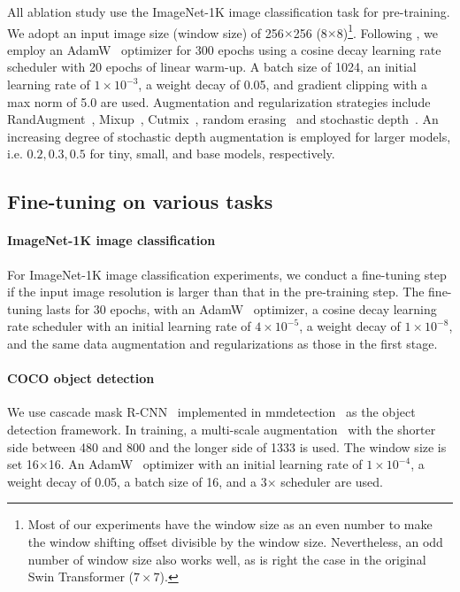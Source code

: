 \documentclass[10pt,twocolumn,letterpaper]{article}
\begin{document}
All ablation study use the ImageNet-1K image classification task for pre-training. We adopt an input image size (window size) of 256$\times$256 (8$\times$8)\footnote{Most of our experiments have the window size as an even number to make the window shifting offset divisible by the window size. Nevertheless, an odd number of window size also works well, as is right the case in the original Swin Transformer ($7\times 7$).}. Following \cite{liu2021swin}, we employ an AdamW~\cite{loshchilov2017decoupled} optimizer for 300 epochs using a cosine decay learning rate scheduler with 20 epochs of linear warm-up. A batch size of 1024, an initial learning rate of $1\times10^{-3}$, a weight decay of 0.05, and gradient clipping with a max norm of 5.0 are used. Augmentation and regularization strategies include RandAugment~\cite{cubuk2020randaugment}, Mixup~\cite{zhang2017mixup}, Cutmix~\cite{yun2019cutmix}, random erasing~\cite{zhong2020random} and stochastic depth~\cite{huang2016deep}. An increasing degree of stochastic depth augmentation is employed for larger models, i.e. $0.2, 0.3, 0.5$ for tiny, small, and base models, respectively. 

\subsection{Fine-tuning on various tasks}

\paragraph{ImageNet-1K image classification} For ImageNet-1K image classification experiments, we conduct a fine-tuning step if the input image resolution is larger than that in the pre-training step. The fine-tuning lasts for 30 epochs, with an AdamW~\cite{loshchilov2017decoupled} optimizer, a cosine decay learning rate scheduler with an initial learning rate of $4\times10^{-5}$, a weight decay of $1\times10^{-8}$, and the same data augmentation and regularizations as those in the first stage.

\paragraph{COCO object detection}
We use cascade mask R-CNN~\cite{he2017mask,cai2018cascade} implemented in mmdetection~\cite{chen2019mmdetection} as the object detection framework. In training, a multi-scale augmentation~\cite{carion2020detr,sun2020sparsercnn} with the shorter side between 480 and 800 and the longer side of 1333 is used. The window size is set 16$\times$16. An AdamW~\cite{loshchilov2017decoupled} optimizer with an initial learning rate of $1\times10^{-4}$, a weight decay of 0.05, a batch size of 16, and a 3$\times$ scheduler are used.
\end{document}
